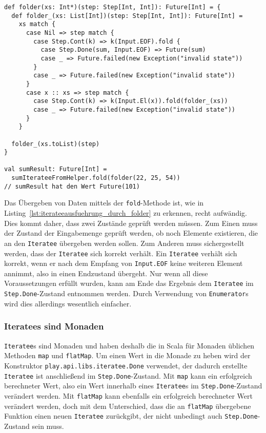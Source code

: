 \begin{lstlisting}[caption=Ausführung eines Iteratees durch folder-Funktion, label=lst:iterateeausfuehrung_durch_folder]
def folder(xs: Int*)(step: Step[Int, Int]): Future[Int] = {
  def folder_(xs: List[Int])(step: Step[Int, Int]): Future[Int] =
    xs match {
      case Nil => step match {
        case Step.Cont(k) => k(Input.EOF).fold {
          case Step.Done(sum, Input.EOF) => Future(sum)
          case _ => Future.failed(new Exception("invalid state"))
        }
        case _ => Future.failed(new Exception("invalid state"))
      }
      case x :: xs => step match {
        case Step.Cont(k) => k(Input.El(x)).fold(folder_(xs))
        case _ => Future.failed(new Exception("invalid state"))
      }
    }

  folder_(xs.toList)(step)
}

val sumResult: Future[Int] =
  sumIterateeFromHelper.fold(folder(22, 25, 54))
// sumResult hat den Wert Future(101)
\end{lstlisting}

Das Übergeben von Daten mittels der \lstinline|fold|-Methode ist, wie in Listing~\ref{lst:iterateeausfuehrung_durch_folder} zu erkennen, recht aufwändig.
Dies kommt daher, dass zwei Zustände geprüft werden müssen.
Zum Einen muss der Zustand der Eingabemenge geprüft werden, ob noch Elemente existieren, die an den \lstinline|Iteratee| übergeben werden sollen.
Zum Anderen muss sichergestellt werden, dass der \lstinline|Iteratee| sich korrekt verhält.
Ein \lstinline|Iteratee| verhält sich korrekt, wenn er nach dem Empfang von \lstinline|Input.EOF| keine weiteren Element annimmt, also in einen Endzustand übergeht.
Nur wenn all diese Voraussetzungen erfüllt wurden, kann am Ende das Ergebnis dem \lstinline|Iteratee| im \lstinline|Step.Done|-Zustand entnommen werden.
Durch Verwendung von \lstinline|Enumerator|s wird dies allerdings wesentlich einfacher.


\subsubsection{Iteratees sind Monaden} %
\label{ssub:iteratees_sind_monaden}

\lstinline|Iteratee|s sind Monaden und haben deshalb die in Scala für Monaden üblichen Methoden \lstinline|map| und \lstinline|flatMap|.
Um einen Wert in die Monade zu heben wird der Konstruktor \lstinline|play.api.libs.iteratee.Done| verwendet, der dadurch erstellte \lstinline|Iteratee| ist anschließend im \lstinline|Step.Done|-Zustand.
Mit \lstinline|map| kann ein erfolgreich berechneter Wert, also ein Wert innerhalb eines \lstinline|Iteratee|s im \lstinline|Step.Done|-Zustand verändert werden.
Mit \lstinline|flatMap| kann ebenfalls ein erfolgreich berechneter Wert verändert werden, doch mit dem Unterschied, dass die an \lstinline|flatMap| übergebene Funktion einen neuen \lstinline|Iteratee| zurückgibt, der nicht unbedingt auch \lstinline|Step.Done|-Zustand sein muss.

